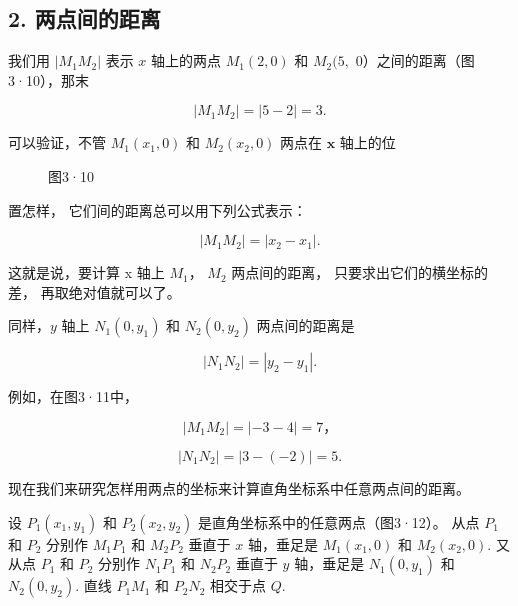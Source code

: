 \subsection{2. 两点间的距离}

我们用 \(|M_1M_2|\) 表示 \(x\) 轴上的两点 \(M_{1}(2,0)\) 和 \(M_{2}(5,\)
0）之间的距离（图3·10），那末

\[
\left| M _ {1} M _ {2} \right| = | 5 - 2 | = 3.
\]

可以验证，不管 \(M_{1}(x_{1},0)\) 和 \(M_{2}(x_{2},0)\) 两点在
\(\pmb{x}\) 轴上的位

\begin{figure}
\centering
{}
\caption{图3·10}
\end{figure}


置怎样， 它们间的距离总可以用下列公式表示：

\[
\left| M _ {1} M _ {2} \right| = \left| x _ {2} - x _ {1} \right|.
\]

这就是说，要计算 x 轴上 \(M_{1}\)， \(M_{2}\) 两点间的距离，
只要求出它们的横坐标的差， 再取绝对值就可以了。

同样，\(y\) 轴上 \(N_{1}(0, y_{1})\) 和 \(N_{2}(0, y_{2})\)
两点间的距离是

\[
\left| N _ {1} N _ {2} \right| = \left| y _ {2} - y _ {1} \right|.
\]

例如，在图3·11中，

\[
\left| M _ {1} M _ {2} \right| = | - 3 - 4 | = 7\text{，}
\]

\[
\left| N _ {1} N _ {2} \right| = | 3 - (- 2) | = 5.
\]

现在我们来研究怎样用两点的坐标来计算直角坐标系中任意两点间的距离。

设 \(P_{1}(x_{1},y_{1})\) 和 \(P_{2}(x_{2},y_{2})\)
是直角坐标系中的任意两点（图3·12）。 从点 \(P_{1}\) 和 \(P_{2}\) 分别作
\(M_{1}P_{1}\) 和 \(M_{2}P_{2}\) 垂直于 \(x\) 轴，垂足是
\(M_{1}(x_{1},0)\) 和 \(M_{2}(x_{2},0)\). 又从点 \(P_{1}\) 和 \(P_{2}\)
分别作 \(N_{1}P_{1}\) 和 \(N_{2}P_{2}\) 垂直于 \(y\) 轴，垂足是
\(N_{1}(0,y_{1})\) 和 \(N_{2}(0,y_{2})\). 直线 \(P_{1}M_{1}\) 和
\(P_{2}N_{2}\) 相交于点 \(Q\).

